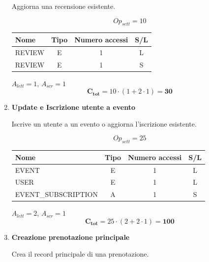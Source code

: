 \documentclass[a4paper,12pt]{report}
\begin{document}
\begin{enumerate}
    Aggiorna una recensione esistente.
    
    $$Op_{sett} = 10$$
    
    \begin{table}[H]
        \centering
        \small
        \renewcommand{\arraystretch}{1.15}
        \begin{tabularx}{0.8\textwidth}{|X|c|c|c|}
            \hline
            \rowcolor{gray!20}
            \textbf{Nome} & \textbf{Tipo} & \textbf{Numero accessi} & \textbf{S/L} \\
            \hline
            REVIEW & E & 1 & L \\
            REVIEW & E & 1 & S \\
            \hline
        \end{tabularx}
    \end{table}
    
    $A_{lett} = 1$, $A_{scr} = 1$
    $$\mathbf{C_{tot}} = 10 \cdot (1 + 2 \cdot 1) = \mathbf{30}$$

    \item {\large \textbf{Update e Iscrizione utente a evento}} \label{op12}
    
    Iscrive un utente a un evento o aggiorna l'iscrizione esistente.
    
    $$Op_{sett} = 25$$
    
    \begin{table}[H]
        \centering
        \small
        \renewcommand{\arraystretch}{1.15}
        \begin{tabularx}{0.8\textwidth}{|X|c|c|c|}
            \hline
            \rowcolor{gray!20}
            \textbf{Nome} & \textbf{Tipo} & \textbf{Numero accessi} & \textbf{S/L} \\
            \hline
            EVENT & E & 1 & L \\
            USER & E & 1 & L \\
            EVENT\_SUBSCRIPTION & A & 1 & S \\
            \hline
        \end{tabularx}
    \end{table}
    
    $A_{lett} = 2$, $A_{scr} = 1$
    $$\mathbf{C_{tot}} = 25 \cdot (2 + 2 \cdot 1) = \mathbf{100}$$

    \item {\large \textbf{Creazione prenotazione principale}} \label{op13}
    
    Crea il record principale di una prenotazione.
    

\end{enumerate}
\end{document}
